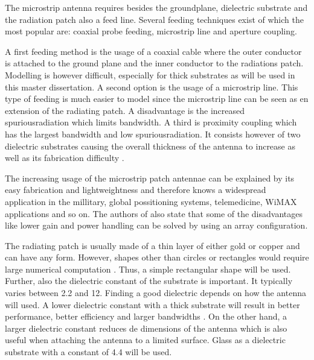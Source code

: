 The microstrip antenna requires besides the groundplane, dielectric substrate and the radiation patch also a feed line. Several feeding techniques exist of which the most popular are: coaxial probe feeding, microstrip line and aperture coupling. %

A first feeding method is the usage of a coaxial cable where the outer conductor is attached to the ground plane and the inner conductor to the radiations patch. Modelling is however difficult, especially for thick substrates as will be used in this master dissertation.
A second option is the usage of a microstrip line. This type of feeding is much easier to model since the microstrip line can be seen as en extension of the radiating patch.
A disadvantage is the increased \gls{spuriousradiation} which limits bandwidth.
A third is proximity coupling which has the largest bandwidth and low \gls{spuriousradiation}. It consists however of two dielectric substrates causing the overall thickness
of the antenna to increase as well as its fabrication difficulty \cite{J13_microstripadvantages}.

The increasing usage of the microstrip patch antennae can be explained by its easy fabrication and lightweightness 
and therefore knows a widespread application in the millitary, global possitioning systems, telemedicine, 
WiMAX applications and so on.
The authors of \cite{J13_microstripadvantages} also state that some of the disadvantages like lower gain and power 
handling can be solved by using an array configuration.

The radiating patch is usually made of a thin layer of either gold or copper \cite{J14_antennadesign,J15_antennadesign}
and can have any form. However, shapes other than circles or rectangles would require large numerical computation \cite{J14_antennadesign}.
Thus, a simple rectangular shape will be used.
Further, also the \gls{dielectric constant} of the substrate is important. It typically varies between 2.2 and 12.
Finding a good dielectric depends on how the antenna will used. A lower
\gls{dielectric constant} with a thick substrate will result in better performance, better efficiency and larger bandwidths  \cite{J15_antennadesign}.
On the other hand, a larger \gls{dielectric constant} reduces de dimensions of the antenna \cite{J14_antennadesign}
which is also useful when attaching the 
antenna to a limited surface. Glass as a dielectric substrate with a constant of 4.4 will be used.


